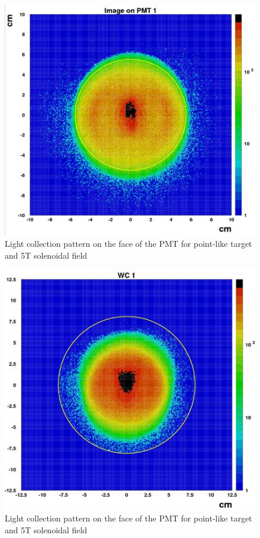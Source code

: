 \begin{figure}[!h]
    \centering
    \includegraphics[width=1.0\linewidth,trim={0.0cm 0.0cm 0.0cm 0.0cm},clip]{images/10cm_Targ_5T_Field_PMT.jpg}
    \caption{Light collection pattern on the face of the PMT for point-like target and 5T solenoidal field}
    \label{fig:10cm_Targ_5T_Field_PMT}
\end{figure}

\begin{figure}[!h]
    \centering
    \includegraphics[width=1.0\linewidth,trim={0.0cm 0.0cm 0.0cm 0.0cm},clip]{images/10cm_Targ_5T_Field_WCone.jpg}
    \caption{Light collection pattern on the face of the PMT for point-like target and 5T solenoidal field}
    \label{fig:10cm_Targ_5T_Field_WCone}
\end{figure}


